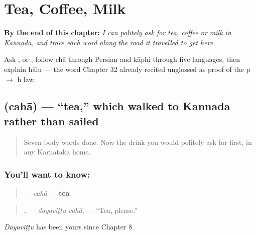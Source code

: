 
\chapter{Tea, Coffee, Milk}
\label{ch:ka-tea-coffee-milk}

\begin{chapteropening}
\textbf{By the end of this chapter:} \emph{I can politely ask for tea, coffee or milk in Kannada, and trace each word along the road it travelled to get here.}

Ask  ,  or , follow chā through Persian and kāphi through five languages, then explain hālu — the word Chapter 32 already recited unglossed as proof of the p $\to$ h law.
\end{chapteropening}

\section[\texorpdfstring{\kn{ಚಹಾ} (cahā)}{ಚಹಾ (cahā)}]{ (cahā) — \textquotedblleft{}tea,\textquotedblright{} which walked to Kannada rather than sailed}

\label{lesson:KA-C39-chaha}



\begin{quote}
Seven body words done. Now the drink you would politely ask for first, in any Karnataka home.
\end{quote}

\subsection*{You'll want to know: }
\begin{quote}
\textbf{} — \emph{cahā} — \textbf{tea}
\end{quote}

\begin{quote}
\textbf{ .} — \emph{dayaviṭṭu cahā.} — \textquotedblleft{}Tea, please.\textquotedblright{}
\end{quote}

\emph{Dayaviṭṭu} has been yours since Chapter 8.

